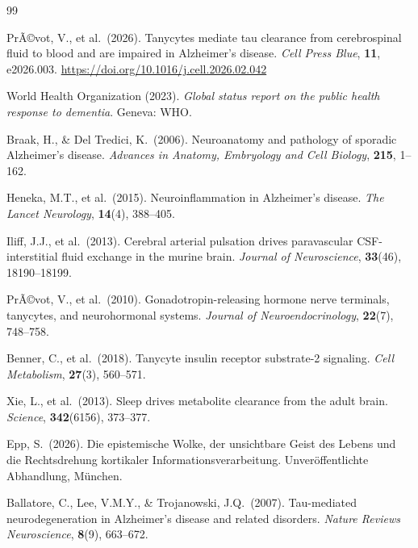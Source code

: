 ﻿\documentclass[12pt,a4paper]{article}
\theoremstyle{definition}
\begin{document}
	\begin{thebibliography}{99}
		
		PrÃ©vot, V., et al.\ (2026). Tanycytes mediate tau clearance from cerebrospinal fluid to blood and are impaired in Alzheimer's disease. \textit{Cell Press Blue}, \textbf{11}, e2026.003. \url{https://doi.org/10.1016/j.cell.2026.02.042}
		
		World Health Organization (2023). \textit{Global status report on the public health response to dementia}. Geneva: WHO.
		
		Braak, H., \& Del Tredici, K.\ (2006). Neuroanatomy and pathology of sporadic Alzheimer's disease. \textit{Advances in Anatomy, Embryology and Cell Biology}, \textbf{215}, 1--162.
		
		Heneka, M.T., et al.\ (2015). Neuroinflammation in Alzheimer's disease. \textit{The Lancet Neurology}, \textbf{14}(4), 388--405.
		
		Iliff, J.J., et al.\ (2013). Cerebral arterial pulsation drives paravascular CSF-interstitial fluid exchange in the murine brain. \textit{Journal of Neuroscience}, \textbf{33}(46), 18190--18199.
		
		PrÃ©vot, V., et al.\ (2010). Gonadotropin-releasing hormone nerve terminals, tanycytes, and neurohormonal systems. \textit{Journal of Neuroendocrinology}, \textbf{22}(7), 748--758.
		
		Benner, C., et al.\ (2018). Tanycyte insulin receptor substrate-2 signaling. \textit{Cell Metabolism}, \textbf{27}(3), 560--571.
		
		Xie, L., et al.\ (2013). Sleep drives metabolite clearance from the adult brain. \textit{Science}, \textbf{342}(6156), 373--377.
		
		Epp, S.\ (2026). Die epistemische Wolke, der unsichtbare Geist des Lebens und die Rechtsdrehung kortikaler Informationsverarbeitung. Unver\"offentlichte Abhandlung, M\"unchen.

		Ballatore, C., Lee, V.M.Y., \& Trojanowski, J.Q.\ (2007). Tau-mediated neurodegeneration in Alzheimer's disease and related disorders. \textit{Nature Reviews Neuroscience}, \textbf{8}(9), 663--672.
		

\end{thebibliography}
\end{document}
